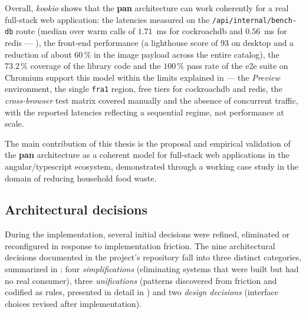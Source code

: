 Overall, \textit{\gls{kookio}} shows that the \textbf{\gls{pan}} architecture can work coherently for a real full-stack \gls{web} application: the latencies measured on the \texttt{/api/internal/bench-db} route (median over warm calls of \(1.71\)~ms for \gls{cockroachdb} and \(0.56\)~ms for \gls{redis} --- ), the front-end performance (a \gls{lighthouse} score of 93 on desktop and a reduction of about \(60\,\%\) in the image payload across the entire catalog), the \(73.2\,\%\) coverage of the library code and the \(100\,\%\) pass rate of the \acrshort{e2e} suite on Chromium support this model within the limits explained in  --- the \textit{Preview} environment, the single \texttt{fra1} region, free tiers for \gls{cockroachdb} and \gls{redis}, the \textit{cross-browser} test matrix covered manually and the absence of concurrent traffic, with the reported latencies reflecting a sequential regime, not performance at scale.

The main contribution of this thesis is the proposal and empirical validation of the \textbf{\gls{pan}} architecture as a coherent model for full-stack \gls{web} applications in the \gls{angular}/\gls{typescript} ecosystem, demonstrated through a working case study in the domain of reducing household food waste.

\subsection{Architectural decisions}\label{subsec:decizii-arhitecturale}

During the implementation, several initial decisions were refined, eliminated or reconfigured in response to implementation friction. The nine architectural decisions documented in the project's repository fall into three distinct categories, summarized in : four \textit{simplifications} (eliminating systems that were built but had no real consumer), three \textit{unifications} (patterns discovered from friction and codified as rules, presented in detail in ) and two \textit{design decisions} (interface choices revised after implementation).

